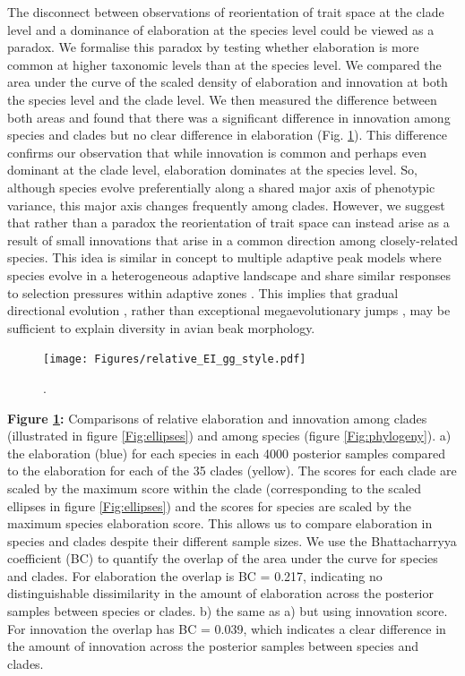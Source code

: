 \documentclass[12pt,letterpaper]{article}
\begin{document}

The disconnect between observations of reorientation of trait space at the clade level and a dominance of elaboration at the species level could be viewed as a paradox.
We formalise this paradox by testing whether elaboration is more common at higher taxonomic levels than at the species level.
We compared the area under the curve of the scaled density of elaboration and innovation at both the species level and the clade level.
We then measured the difference between both areas and found that there was a significant difference in innovation among species and clades but no clear difference in elaboration (Fig. \ref{Fig:relative_EI}).
This difference confirms our observation that while innovation is common and perhaps even dominant at the clade level, elaboration dominates at the species level. So, although species evolve preferentially along a shared major axis of phenotypic variance, this major axis changes frequently among clades.
However, we suggest that rather than a paradox the reorientation of trait space can instead arise as a result of small innovations that arise in a common direction among closely-related species.
This idea is similar in concept to multiple adaptive peak models where species evolve in a heterogeneous adaptive landscape and share similar responses to selection pressures within adaptive zones \cite{hansen1997stabilizing}.
This implies that gradual directional evolution \cite{pagel2022general}, rather than exceptional megaevolutionary jumps \cite{cooney2017mega,venditti2011multiple}, may be sufficient to explain diversity in avian beak morphology.

\begin{figure}[!htbp]
\centering
   \texttt{[image: Figures/relative\_EI\_gg\_style.pdf]}
\caption{.}
\label{Fig:relative_EI}
\end{figure}

\bigskip

\noindent \textbf{Figure \ref{Fig:relative_EI}:} Comparisons of relative elaboration and innovation among clades (illustrated in figure \ref{Fig:ellipses}) and among species (figure \ref{Fig:phylogeny}).
a) the elaboration (blue) for each species in each 4000 posterior samples compared to the elaboration for each of the 35 clades (yellow).
The scores for each clade are scaled by the maximum score within the clade (corresponding to the scaled ellipses in figure \ref{Fig:ellipses}) and the scores for species are scaled by the maximum species elaboration score.
This allows us to compare elaboration in species and clades despite their different sample sizes.
We use the Bhattacharryya coefficient (BC) to quantify the overlap of the area under the curve for species and clades. 
For elaboration the overlap is BC = 0.217, indicating no distinguishable dissimilarity in the amount of elaboration across the posterior samples between species or clades. 
b) the same as a) but using innovation score. 
For innovation the overlap has BC = 0.039, which indicates a clear difference in the amount of innovation across the posterior samples between species and clades.
\end{document}

